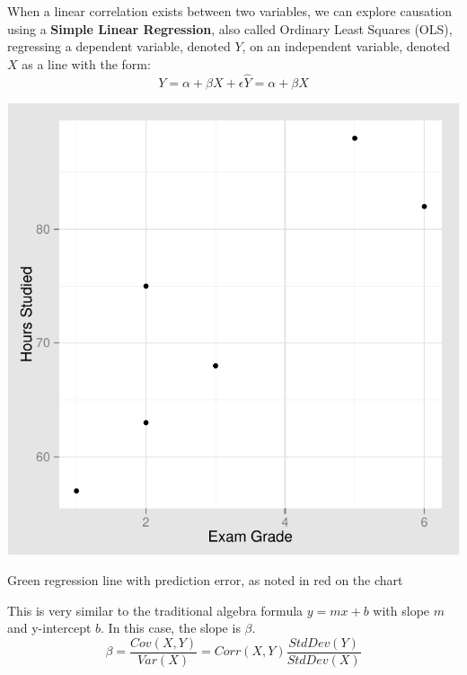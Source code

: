 \documentclass[nohyper,justified]{tufte-handout}\usepackage[]{graphicx}\usepackage[]{color}
\makeatletter
\def\maxwidth{ %
  \ifdim\Gin@nat@width>\linewidth
    \linewidth
  \else
    \Gin@nat@width
  \fi
}
\newenvironment{knitrout}{}{} %
\makeatother
\begin{document}
When a linear correlation exists between two variables, we can explore causation using a \textbf{Simple Linear Regression}, also called Ordinary Least Squares (OLS), regressing a dependent variable, denoted $Y$, on an independent variable, denoted $X$ as a line with the form:
\begin{equation*}
Y=\alpha + {\beta}X +{\epsilon}
\hat{Y}={\alpha} + {\beta}X 
\end{equation*}
\begin{knitrout}
\color{fgcolor}\begin{marginfigure}

{\centering \includegraphics[width=\maxwidth]{figure/graphics-ols-1} 

}

\caption[Green regression line with prediction error, as noted in red on the chart]{Green regression line with prediction error, as noted in red on the chart}\label{fig:ols}
\end{marginfigure}


\end{knitrout}
This is very similar to the traditional algebra formula $y=mx+b$ with slope $m$ and y-intercept $b$. In this case, the slope is ${\beta}$.
\begin{equation*}
{\beta}=\frac{Cov(X,Y)}{Var(X)}=Corr(X,Y)\frac{StdDev(Y)}{StdDev(X)}
\end{equation*}
\end{document}
